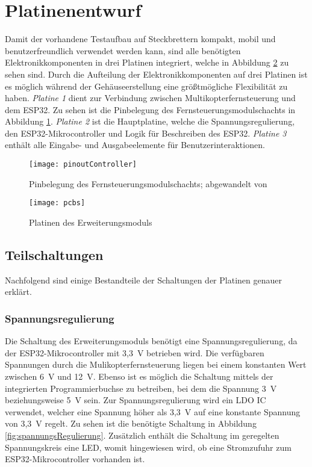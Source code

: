 \section{Platinenentwurf}
Damit der vorhandene Testaufbau auf Steckbrettern kompakt, mobil und benutzerfreundlich verwendet werden kann, sind alle benötigten Elektronikkomponenten in drei Platinen integriert, welche in Abbildung \ref{fig:pcbs} zu sehen sind. Durch die Aufteilung der Elektronikkomponenten auf drei Platinen ist es möglich während der Gehäuseerstellung eine größtmögliche Flexibilität zu haben. \textit{Platine 1} dient zur Verbindung zwischen Multikopterfernsteuerung und dem ESP32. Zu sehen ist die Pinbelegung des Fernsteuerungsmodulschachts in Abbildung \ref{fig:pinoutController}. \textit{Platine 2} ist die Hauptplatine, welche die Spannungsregulierung, den ESP32-Mikrocontroller und Logik für Beschreiben des ESP32. \textit{Platine 3} enthält alle Eingabe- und Ausgabeelemente für Benutzerinteraktionen.

\begin{figure}[h]
    \centering
    \texttt{[image: pinoutController]}
    \caption{Pinbelegung des Fernsteuerungsmodulschachts; abgewandelt von \cite{liteModulePinout}}
    \label{fig:pinoutController}
\end{figure}

\begin{figure}[h]
    \centering
    \texttt{[image: pcbs]}
    \caption{Platinen des Erweiterungsmoduls}
    \label{fig:pcbs}
\end{figure}

\subsection{Teilschaltungen}
Nachfolgend sind einige Bestandteile der Schaltungen der Platinen genauer erklärt.

\subsubsection{Spannungsregulierung}
Die Schaltung des Erweiterungsmoduls benötigt eine Spannungsregulierung, da der ESP32-Mikrocontroller mit 3,3~V betrieben wird. Die verfügbaren Spannungen durch die Mulikopterfernsteuerung liegen bei einem konstanten Wert zwischen 6~V und 12~V. Ebenso ist es möglich die Schaltung mittels der integrierten Programmierbuchse zu betreiben, bei dem die Spannung 3~V beziehungsweise 5~V sein. Zur Spannungsregulierung wird ein \ac{LDO} \ac{IC} verwendet, welcher eine Spannung höher als 3,3~V auf eine konstante Spannung von 3,3~V regelt. Zu sehen ist die benötigte Schaltung in Abbildung \ref{fig:spannungsRegulierung}. Zusätzlich enthält die Schaltung im geregelten Spannungskreis eine \acs{LED}, womit hingewiesen wird, ob eine Stromzufuhr zum ESP32-Mikrocontroller vorhanden ist.

